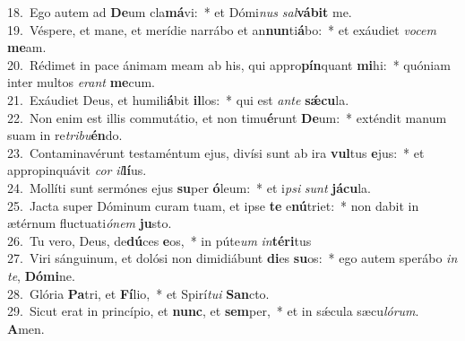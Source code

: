{18.~}Ego autem ad \textbf{De}um cla\textbf{má}vi:~* et Dómi\textit{nus} \textit{sal}\textbf{vá}\textbf{bit} me.\\
{19.~}Véspere, et mane, et merídie narrábo et an\textbf{nun}ti\textbf{á}bo:~* et exáudiet \textit{vo}\textit{cem} \textbf{me}am.\\
{20.~}Rédimet in pace ánimam meam ab his, qui appro\textbf{pín}quant \textbf{mi}hi:~* quóniam inter multos \textit{e}\textit{rant} \textbf{me}cum.\\
{21.~}Exáudiet Deus, et humili\textbf{á}bit \textbf{il}los:~* qui est \textit{an}\textit{te} \textbf{sǽ}\textbf{cu}la.\\
{22.~}Non enim est illis commutátio, et non timu\textbf{é}runt \textbf{De}um:~* exténdit manum suam in re\textit{tri}\textit{bu}\textbf{én}do.\\
{23.~}Contaminavérunt testaméntum ejus, divísi sunt ab ira \textbf{vul}tus \textbf{e}jus:~* et appropinquávit \textit{cor} \textit{il}\textbf{lí}us.\\
{24.~}Mollíti sunt sermónes ejus \textbf{su}per \textbf{ó}leum:~* et i\textit{psi} \textit{sunt} \textbf{já}\textbf{cu}la.\\
{25.~}Jacta super Dóminum curam tuam, et ipse \textbf{te} e\textbf{nú}triet:~* non dabit in ætérnum fluctuati\textit{ó}\textit{nem} \textbf{ju}sto.\\
{26.~}Tu vero, Deus, de\textbf{dú}ces \textbf{e}os,~* in púte\textit{um} \textit{in}\textbf{té}\textbf{ri}tus\\
{27.~}Viri sánguinum, et dolósi non dimidiábunt \textbf{di}es \textbf{su}os:~* ego autem sperábo \textit{in} \textit{te}, \textbf{Dó}\textbf{mi}ne.\\
{28.~}Glória \textbf{Pa}tri, et \textbf{Fí}lio,~* et Spirí\textit{tu}\textit{i} \textbf{San}cto.\\
{29.~}Sicut erat in princípio, et \textbf{nunc}, et \textbf{sem}per,~* et in sǽcula sæcu\textit{ló}\textit{rum}. \textbf{A}men.\\
